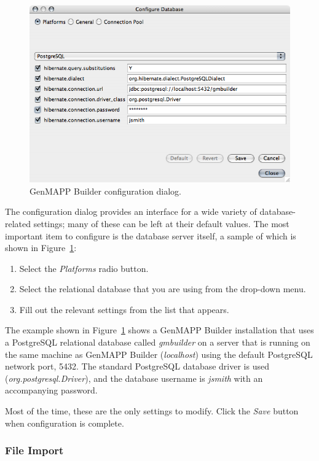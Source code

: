 \documentclass[11pt]{article}
\begin{document}
\begin{figure}[htbp] %
   \centering
   \includegraphics[width=5in]{figures/config.png} 
   \caption{GenMAPP Builder configuration dialog.}
   \label{config}
\end{figure}

The configuration dialog provides an interface for a wide variety of database-related settings; many of these can be left at their default values.  The most important item to configure is the database server itself, a sample of which is shown in Figure~\ref{config}:
\begin{enumerate}
\item Select the \textsl{Platforms} radio button.
\item Select the relational database that you are using from the drop-down menu.
\item Fill out the relevant settings from the list that appears.
\end{enumerate}
The example shown in Figure~\ref{config} shows a GenMAPP Builder installation that uses a PostgreSQL relational database called \emph{gmbuilder} on a server that is running on the same machine as GenMAPP Builder (\emph{localhost}\/) using the default PostgreSQL network port, 5432.  The standard PostgreSQL database driver is used (\emph{org.postgresql.Driver}\/), and the database username is \emph{jsmith} with an accompanying password.

Most of the time, these are the only settings to modify.  Click the \textsl{Save} button when configuration is complete.

\subsubsection{File Import}
\end{document}
